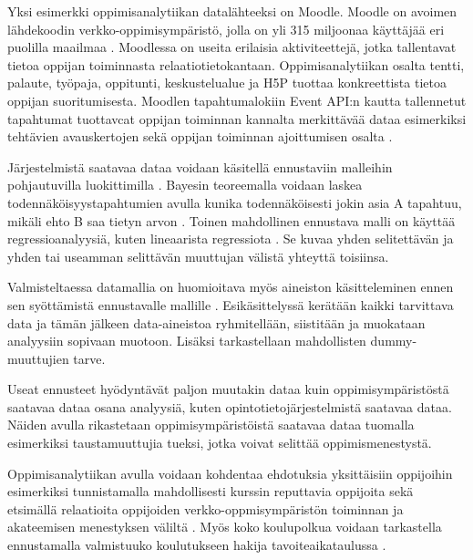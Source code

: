 Yksi esimerkki oppimisanalytiikan datalähteeksi on Moodle. Moodle on avoimen lähdekoodin verkko-oppimisympäristö, jolla on yli 315 miljoonaa käyttäjää eri puolilla maailmaa \citep{dougiamasPowerOpenEducational2021,dougiamasMoodle2022,moodle.orgMoodleStatistics}. Moodlessa on useita erilaisia aktiviteettejä, jotka tallentavat tietoa oppijan toiminnasta relaatiotietokantaan. Oppimisanalytiikan osalta tentti, palaute, työpaja, oppitunti, keskustelualue ja H5P tuottaa konkreettista tietoa oppijan suoritumisesta. Moodlen tapahtumalokiin Event API:n kautta tallennetut tapahtumat tuottavcat oppijan toiminnan kannalta merkittävää dataa esimerkiksi tehtävien avauskertojen sekä oppijan toiminnan ajoittumisen osalta \citep{dougiamasLoggingMoodleDocs2021, abdullahLearningStyleClassification2015}.

Järjestelmistä saatavaa dataa voidaan käsitellä ennustaviin malleihin pohjautuvilla luokittimilla \citep{hamalainenClassifiersEducationalData2010}. Bayesin teoreemalla  voidaan laskea todennäköisyystapahtumien avulla kunika todennäköisesti jokin asia A tapahtuu, mikäli ehto B saa tietyn arvon \citep{natinggaDataScienceAlgorithms2018}. Toinen mahdollinen ennustava malli on käyttää regressioanalyysiä, kuten lineaarista regressiota \citep{rossIntroductoryStatistics2017}. Se kuvaa yhden selitettävän ja yhden tai useamman selittävän muuttujan välistä yhteyttä toisiinsa.

Valmisteltaessa datamallia on huomioitava myös aineiston käsitteleminen ennen sen syöttämistä ennustavalle mallille \citep{romeroSurveyPreProcessingEducational2014, rossIntroductoryStatistics2017}. Esikäsittelyssä kerätään kaikki tarvittava data ja tämän jälkeen data-aineistoa ryhmitellään, siistitään ja muokataan analyysiin sopivaan muotoon. Lisäksi tarkastellaan mahdollisten dummy-muuttujien tarve.

Useat ennusteet hyödyntävät paljon muutakin dataa kuin oppimisympäristöstä saatavaa dataa osana analyysiä, kuten opintotietojärjestelmistä saatavaa dataa. Näiden avulla rikastetaan oppimisympäristöistä saatavaa dataa tuomalla esimerkiksi taustamuuttujia tueksi, jotka voivat selittää oppimismenestystä.%

Oppimisanalytiikan avulla voidaan kohdentaa ehdotuksia yksittäisiin oppijoihin esimerkiksi tunnistamalla mahdollisesti kurssin reputtavia oppijoita \citep{barberCourseCorrectionUsing2012} sekä etsimällä relaatioita oppijoiden verkko-oppmisympäristön toiminnan ja akateemisen menestyksen väliltä \citep{agudo-peregrinaCanWePredict2014}. Myös koko koulupolkua voidaan tarkastella ennustamalla valmistuuko koulutukseen hakija tavoiteaikataulussa \citep{barberCourseCorrectionUsing2012a}.

